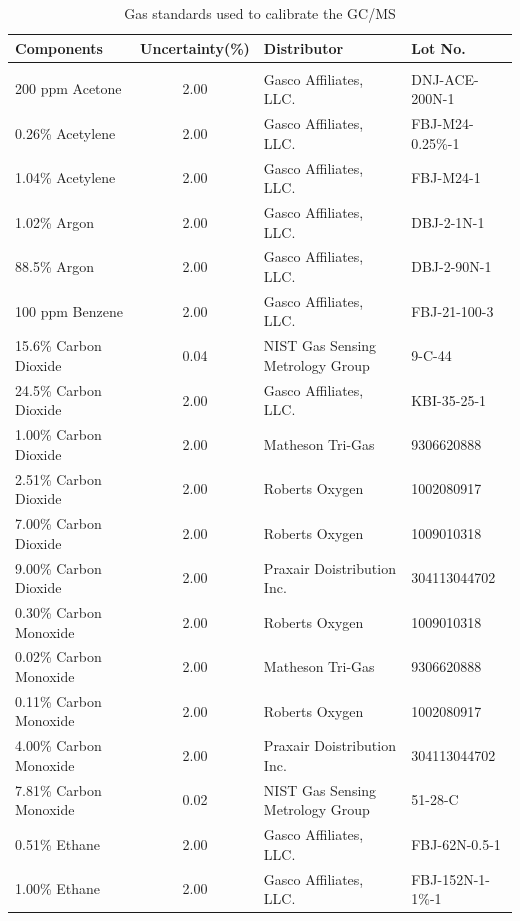 \documentclass[12pt]{article}
\begin{document}
\begin{table}[h!]

\caption{Gas standards used to calibrate the GC/MS}
\label{tab:Gas_Standards_Table}
\centering
	\footnotesize
	\begin{tabular}{lcll}
			\hline
\textbf{Components} &\textbf{Uncertainty(\%)}& \textbf{Distributor}	& \textbf{Lot No.}		\\
\hline
\\[0.001cm]
200 ppm Acetone		&	2.00	&	Gasco Affiliates, LLC. 				&	DNJ-ACE-200N-1		\\
0.26\% Acetylene		&	2.00	&	Gasco Affiliates, LLC.				&	FBJ-M24-0.25\%-1		\\
1.04\% Acetylene		&	2.00	&	Gasco Affiliates, LLC.				&	FBJ-M24-1			\\
1.02\% Argon		&	2.00	&	Gasco Affiliates, LLC.				&	DBJ-2-1N-1			\\
88.5\% Argon		&	2.00	&	Gasco Affiliates, LLC.				&	DBJ-2-90N-1			\\
100 ppm Benzene		&	2.00	&	Gasco Affiliates, LLC.				&	FBJ-21-100-3		\\
15.6\% Carbon Dioxide	&	0.04	&	NIST Gas Sensing Metrology Group		&	9-C-44			\\
24.5\% Carbon Dioxide	&	2.00	&	Gasco Affiliates, LLC. 				&	KBI-35-25-1			\\
1.00\% Carbon Dioxide	&	2.00	&	Matheson Tri-Gas					&	9306620888			\\
2.51\% Carbon Dioxide	&	2.00	&	Roberts Oxygen					&	1002080917			\\
7.00\% Carbon Dioxide	&	2.00	&	Roberts Oxygen					&	1009010318			\\
9.00\% Carbon Dioxide	&	2.00	&	Praxair Doistribution Inc. 				&	304113044702		\\
0.30\% Carbon Monoxide	&	2.00	&	Roberts Oxygen					&	1009010318			\\
0.02\% Carbon Monoxide	&	2.00	&	Matheson Tri-Gas					&	9306620888			\\
0.11\% Carbon Monoxide	&	2.00	&	Roberts Oxygen					&	1002080917			\\
4.00\% Carbon Monoxide	&	2.00	&	Praxair Doistribution Inc. 				&	304113044702		\\
7.81\% Carbon Monoxide	&	0.02	&	NIST Gas Sensing Metrology Group 		&	51-28-C			\\
0.51\% Ethane		&	2.00	&	Gasco Affiliates, LLC.				&	FBJ-62N-0.5-1		\\
1.00\% Ethane		&	2.00	&	Gasco Affiliates, LLC.				&	FBJ-152N-1-1\%-1		\\

\end{tabular}
\end{table}
\end{document}
